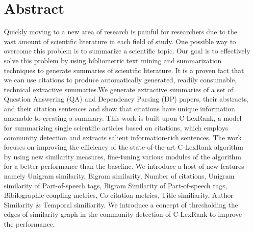 \chapter*{Abstract} %
Quickly moving to a new area of research is painful for researchers due to the vast amount of scientific literature in each field of study. One possible way to overcome this problem is to summarize a scientific
topic. Our goal is to effectively solve this problem by using bibliometric text mining and summarization techniques to generate summaries of scientific literature. It is a proven fact that we can use citations to produce automatically generated, readily consumable, technical extractive summaries.We generate extractive summaries of a set of Question Answering (QA) and
Dependency Parsing (DP) papers, their abstracts, and their citation sentences and show
that citations have unique information amenable to creating a summary. This work is built upon C-LexRank, a model for summarizing single scientific articles based on citations, which employs community detection and extracts salient information-rich sentences. The work focuses on improving the efficiency of the state-of-the-art C-LexRank algorithm by using new similarity measures, fine-tuning various modules of the algorithm for a better performance than the baseline. We introduce a host of new features namely Unigram similarity, Bigram similarity, Number of citations, Unigram similarity of Part-of-speech tags, Bigram Similarity of Part-of-speech tags, Bibilographic coupling metrics, Co-citation metrics, Title similiarity, Author Similarity \& Temporal similiarity. We introduce a concept of thresholding the edges of similarity graph in the community detection of C-LexRank to improve the performance.